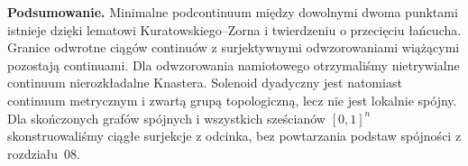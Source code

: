 \par\smallskip\noindent\textbf{Podsumowanie.}
Minimalne podcontinuum między dowolnymi
dwoma punktami istnieje dzięki
lematowi Kuratowskiego--Zorna
i twierdzeniu o przecięciu łańcucha.
Granice odwrotne ciągów continuów
z surjektywnymi odwzorowaniami wiążącymi
pozostają continuami.
Dla odwzorowania namiotowego
otrzymaliśmy nietrywialne
continuum nierozkładalne Knastera.
Solenoid dyadyczny jest natomiast
continuum metrycznym i zwartą
grupą topologiczną, lecz
nie jest lokalnie spójny.
Dla skończonych grafów spójnych
i wszystkich sześcianów \([0,1]^n\)
skonstruowaliśmy ciągłe surjekcje
z odcinka, bez powtarzania
podstaw spójności z rozdziału~08.
